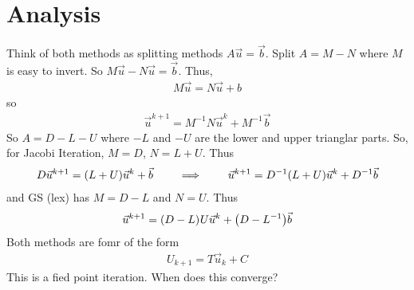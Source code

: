 \documentclass{article}
\begin{document}
        \section{Analysis}
            Think of both methods as splitting methods $A\vec{u} = \vec{b}$.  Split $A = M - N$ where $M$ is easy to invert.  So $M\vec{u} - N\vec{u} = \vec{b}$.  Thus,
            \begin{align*}
                M\vec{u} = N\vec{u} + b
            \end{align*}
            so
            \begin{align*}
                \vec{u}^{k+1} = M^{-1}N\vec{u}^k + M^{-1}\vec{b}
            \end{align*}
            So $A = D - L - U$ where $-L$ and $-U$ are the lower and upper trianglar parts.  So, for Jacobi Iteration, $M = D$, $N = L + U$.  Thus
            \begin{align*}
                D\vec{u}^{k+1} = (L+U)\vec{u}^k + \vec{b} \qquad \implies \qquad \vec{u}^{k+1} = D^{-1}\qty(L+U)\vec{u}^k + D^{-1}\vec{b}
            \end{align*}
            and GS (lex) has $M = D - L$ and $N = U$.  Thus
            \begin{align*}
                \vec{u}^{k+1} = \qty(D - L)^{}U\vec{u}^{k} + \qty(D - L^{-1})\vec{b}
            \end{align*}
            Both methods are fomr of the form
            \begin{align*}
                U_{k+1} = T\vec{u}_k + C
            \end{align*}
            This is a fied point iteration.  When does this converge?
\end{document}
